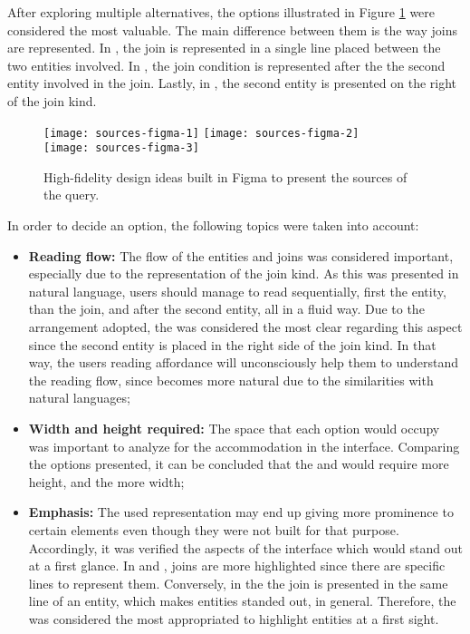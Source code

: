 After exploring multiple alternatives, the options illustrated in Figure \ref{fig:sourcesFigma} were considered the most valuable. The main difference between them is the way joins are represented. In , the join is represented in a single line placed between the two entities involved. In , the join condition is represented after the the second entity involved in the join. Lastly, in , the second entity is presented on the right of the join kind.

\begin{figure}[tb]
  \centering
    {\texttt{[image: sources-figma-1]}}%
    {\texttt{[image: sources-figma-2]}}%
    \\
  {\texttt{[image: sources-figma-3]}}%
\caption{High-fidelity design ideas built in Figma to present the sources of the query.}
  \label{fig:sourcesFigma}
\end{figure}

In order to decide an option, the following topics were taken into account:

\begin{itemize}
  \item \textbf{Reading flow: } The flow of the entities and joins was considered important, especially due to the representation of the join kind. As this was presented in natural language, users should manage to read sequentially, first the entity, than the join, and after the second entity, all in a fluid way. Due to the arrangement adopted, the  was considered the most clear regarding this aspect since the second entity is placed in the right side of the join kind. In that way, the users reading affordance will unconsciously help them to understand the reading flow, since becomes more natural due to the similarities with natural languages;
  \item \textbf{Width and height required: }The space that each option would occupy was important to analyze for the accommodation in the interface. Comparing the options presented, it can be concluded that the  and  would require more height, and the  more width;
  \item \textbf{Emphasis: }The used representation may end up giving more prominence to certain elements even though they were not built for that purpose. Accordingly, it was verified the aspects of the interface which would stand out at a first glance. In  and , joins are more highlighted since there are specific lines to represent them. Conversely, in the  the join is presented in the same line of an entity, which makes entities standed out, in general. Therefore, the  was considered the most appropriated to highlight entities at a first sight.
\end{itemize}

